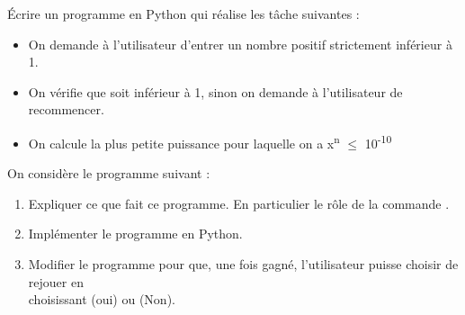 \begin{boxexstheorieligne}
\eexo
\pagebreak[3]



\exo
Écrire un programme en Python qui réalise les tâche suivantes :
\begin{itemize}[leftmargin=7mm,itemsep=0mm,labelsep=2mm]
\item On demande à l'utilisateur d'entrer un nombre positif \textbf{} strictement inférieur à 1.

\item On vérifie que \textbf{} soit inférieur à 1, sinon on demande à l'utilisateur de recommencer.

\item On calcule la plus petite puissance \textbf{} pour laquelle on a x\textsuperscript{n} $\leqslant$ 10\textsuperscript{-10}
\end{itemize}





\eexo
\pagebreak[3]



\exo
On considère le programme suivant :

\vspace{-5mm}
\begin{center}
\end{center}

\vspace{-5mm}
\makeatletter
\begin{enumerate}[label=\alph*),itemsep=1mm,left=0mm]
\item Expliquer ce que fait ce programme. En particulier le rôle de la commande .\par\nobreak\@nobreaktrue
\item Implémenter le programme en Python.\par\nobreak\@nobreaktrue
\item Modifier le programme pour que, une fois gagné, l'utilisateur puisse choisir de rejouer en\\ choisissant  (oui) ou  (Non). \par\nobreak\@nobreaktrue
\end{enumerate}
\makeatother





\end{boxexstheorieligne}
